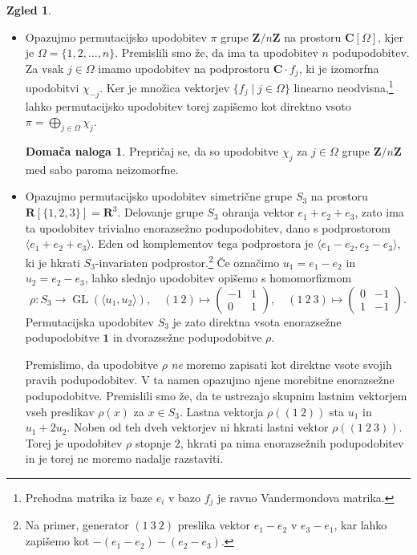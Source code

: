 \documentclass[11pt]{book}
\def\ZZ{\mathbf{Z}}
\def\RR{\mathbf{R}}
\def\CC{\mathbf{C}}
\def\11{\mathbf{1}}
\DeclareMathOperator\GL{GL}
\theoremstyle{definition}
\theoremstyle{zgled}
\newtheorem*{zgled}{Zgled}
\theoremstyle{odprtproblem}
\theoremstyle{domacanaloga}
\newtheorem*{domacanaloga}{Domača naloga}
\theoremstyle{izrek}
\begin{document}
\begin{zgled} \leavevmode
\begin{itemize}
    \item Opazujmo permutacijsko upodobitev $\pi$ grupe $\ZZ/n\ZZ$ na prostoru $\CC[\Omega]$, kjer je $\Omega = \{ 1, 2, \dots, n \}$. Premislili smo že, da ima ta upodobitev $n$ podupodobitev. Za vsak $j \in \Omega$ imamo upodobitev na podprostoru $\CC \cdot f_j$, ki je izomorfna upodobitvi $\chi_{-j}$. Ker je množica vektorjev $\{ f_j \mid j \in \Omega \}$ linearno neodvisna,\footnote{Prehodna matrika iz baze $e_i$ v bazo $f_j$ je ravno Vandermondova matrika.} lahko permutacijsko upodobitev torej zapišemo kot direktno vsoto $\pi = \bigoplus_{j \in \Omega} \chi_j$.
    
    \begin{domacanaloga}
        Prepričaj se, da so upodobitve $\chi_j$ za $j \in \Omega$ grupe $\ZZ/n\ZZ$ med sabo paroma neizomorfne.
    \end{domacanaloga}

    \item Opazujmo permutacijsko upodobitev simetrične grupe $S_3$ na prostoru $\RR[\{ 1,2,3 \}] = \RR^3$. Delovanje grupe $S_3$ ohranja vektor $e_1 + e_2 + e_3$, zato ima ta upodobitev trivialno enorazsežno podupodobitev, dano s podprostorom $\langle e_1 + e_2 + e_3 \rangle$. Eden od komplementov tega podprostora je $\langle e_1 - e_2, e_2 - e_3 \rangle$, ki je hkrati $S_3$-invariaten podprostor.\footnote{Na primer, generator $(1 \ 3 \ 2)$ preslika vektor $e_1 - e_2$ v $e_3 - e_1$, kar lahko zapišemo kot $-(e_1 - e_2) - (e_2 - e_3)$.} Če označimo $u_1 = e_1 - e_2$ in $u_2 = e_2 - e_3$, lahko slednjo upodobitev opišemo s homomorfizmom
    \[
        \rho \colon S_3 \to \GL(\langle u_1, u_2 \rangle), \quad
        (1 \ 2) \mapsto \begin{pmatrix} 
            -1 & 1 \\ 0 & 1 
        \end{pmatrix}, \quad
        (1 \ 2 \ 3) \mapsto \begin{pmatrix} 
            0 & -1 \\ 1 & -1
        \end{pmatrix}.
    \]
    Permutacijska upodobitev $S_3$ je zato direktna vsota enorazsežne podupodobitve $\11$ in dvorazsežne podupodobitve $\rho$. 
    
    Premislimo, da upodobitve $\rho$ \emph{ne} moremo zapisati kot direktne vsote svojih pravih podupodobitev. V ta namen opazujmo njene morebitne enorazsežne podupodobitve. Premislili smo že, da te ustrezajo skupnim lastnim vektorjem vseh preslikav $\rho(x)$ za $x \in S_3$. Lastna vektorja $\rho((1 \ 2))$ sta $u_1$ in $u_1 + 2 u_2$. Noben od teh dveh vektorjev ni hkrati lastni vektor $\rho((1 \ 2 \ 3))$. Torej je upodobitev $\rho$ stopnje $2$, hkrati pa nima enorazsežnih podupodobitev in je torej ne moremo nadalje razstaviti.
\end{itemize}
\end{zgled}
\end{document}
